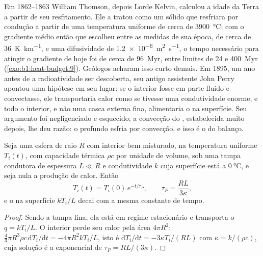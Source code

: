 \begin{history}
Em 1862--1863 William Thomson, depois Lorde Kelvin, calculou a idade da Terra
a partir de seu resfriamento. Ele a tratou como um sólido que resfriara por condução a partir de
uma temperatura uniforme de cerca de \qty{3900}{\degreeCelsius}; com o gradiente médio então
que escolheu entre as medidas de sua época, de cerca de
\qty{36}{K.km^{-1}}, e uma difusividade de
\qty{1.2e-6}{m^2.s^{-1}}, o tempo necessário para atingir o gradiente de hoje foi de cerca de
\qty{96}{Myr}, entre limites de 24 e \qty{400}{Myr} (\cref{exo:b1:heat-budget:9}). Geólogos
acharam isso curto demais. Em 1895, um ano
antes de a radioatividade ser descoberta, seu antigo assistente John Perry apontou
uma hipótese em seu lugar: se o interior fosse em parte fluido e convectasse, ele
transportaria calor como se tivesse uma condutividade enorme, e todo o interior,
e não uma casca externa fina, alimentaria o  na superfície. Seu argumento foi
negligenciado e esquecido; a convecção do , estabelecida muito depois, lhe deu
razão: o  profundo esfria por convecção, e isso é o 
do balanço. %
\end{history}

\begin{proposition}\label{prop:b1:heat-budget:perry}
Seja uma esfera de raio $R$ com interior bem misturado, na temperatura uniforme
$T_i(t)$, com capacidade térmica $\rho c$ por unidade de volume, sob uma
tampa condutora de espessura $L \ll R$ e condutividade $k$ cuja superfície está a
$\qty{0}{\degreeCelsius}$, e seja nula a produção de calor. Então
\[
  T_i(t) = T_i(0)\,e^{-t/\tau_P}, \qquad \tau_P = \frac{RL}{3\kappa},
\]
e o  na superfície $kT_i/L$ decai com a mesma constante de tempo.
\end{proposition}

\begin{proof}
Sendo a tampa fina, ela está em regime estacionário e transporta o 
$q = kT_i/L$. O interior perde seu calor pela área $4\pi R^2$:
$\tfrac43\pi R^3\rho c\,\mathrm dT_i/\mathrm dt = -4\pi R^2 kT_i/L$, isto é
$\mathrm dT_i/\mathrm dt = -3\kappa T_i/(RL)$ com $\kappa = k/(\rho c)$, cuja
solução é a exponencial de $\tau_P = RL/(3\kappa)$.
\end{proof}

